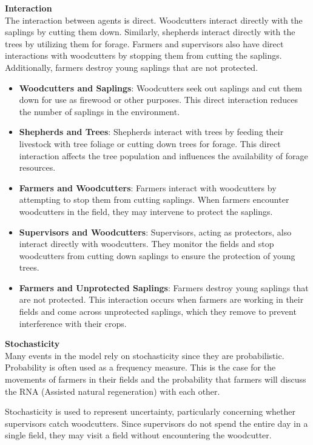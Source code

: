 \documentclass{article}
\begin{document}
        \textbf{Interaction}\\

        The interaction between agents is direct. Woodcutters interact directly with the saplings by cutting them down. Similarly, shepherds interact directly with the trees by utilizing them for forage. Farmers and supervisors also have direct interactions with woodcutters by stopping them from cutting the saplings. Additionally, farmers destroy young saplings that are not protected.

        \begin{itemize}
            \item \textbf{Woodcutters and Saplings}: Woodcutters seek out saplings and cut them down for use as firewood or other purposes. This direct interaction reduces the number of saplings in the environment.
            \item \textbf{Shepherds and Trees}: Shepherds interact with trees by feeding their livestock with tree foliage or cutting down trees for forage. This direct interaction affects the tree population and influences the availability of forage resources.
            \item \textbf{Farmers and Woodcutters}: Farmers interact with woodcutters by attempting to stop them from cutting saplings. When farmers encounter woodcutters in the field, they may intervene to protect the saplings.
            \item \textbf{Supervisors and Woodcutters}: Supervisors, acting as protectors, also interact directly with woodcutters. They monitor the fields and stop woodcutters from cutting down saplings to ensure the protection of young trees.
            \item \textbf{Farmers and Unprotected Saplings}: Farmers destroy young saplings that are not protected. This interaction occurs when farmers are working in their fields and come across unprotected saplings, which they remove to prevent interference with their crops.
        \end{itemize}

        \textbf{Stochasticity}\\

        Many events in the model rely on stochasticity since they are probabilistic. Probability is often used as a frequency measure. This is the case for the movements of farmers in their fields and the probability that farmers will discuss the RNA (Assisted natural regeneration) with each other.

        Stochasticity is used to represent uncertainty, particularly concerning whether supervisors catch woodcutters. Since supervisors do not spend the entire day in a single field, they may visit a field without encountering the woodcutter.
\end{document}
